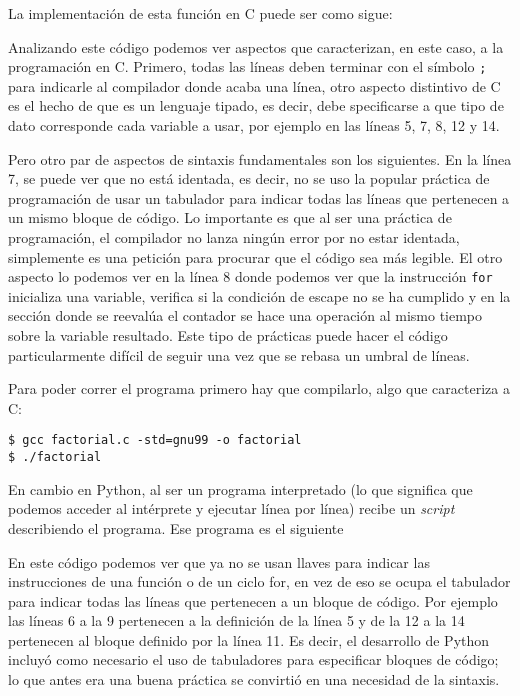 \documentclass{report}
\begin{document}
La implementación de esta función en C puede ser como sigue:



Analizando este código podemos ver aspectos que caracterizan, en este caso, a
la programación en C. Primero, todas las líneas deben terminar con el símbolo
{\tt{;}} para indicarle al compilador donde acaba una línea, otro aspecto 
distintivo de C es el hecho de que es un lenguaje tipado, es decir, debe 
specificarse a que tipo de dato corresponde cada variable a usar, por ejemplo 
en las líneas 5, 7, 8, 12 y 14. 

Pero otro par de aspectos de sintaxis fundamentales son los siguientes. 
En la línea 7, se puede ver que no está identada, es decir, no se uso la 
popular práctica de programación de usar un tabulador para indicar todas las 
líneas que pertenecen a un mismo bloque de código. Lo importante es que al ser
una práctica de programación, el compilador no lanza ningún error por no estar
identada, simplemente es una petición para procurar que el código sea más 
legible. El otro aspecto lo podemos ver en la línea 8 donde podemos ver que
la instrucción {\tt{for}} inicializa una variable, verifica si la condición
de escape no se ha cumplido y en la sección donde se reevalúa el contador 
se hace una operación al mismo tiempo sobre la variable resultado. Este tipo
de prácticas puede hacer el código particularmente difícil de seguir una
vez que se rebasa un umbral de líneas.

Para poder correr el programa primero hay que compilarlo, algo que caracteriza
a C:

\begin{verbatim}
$ gcc factorial.c -std=gnu99 -o factorial
$ ./factorial
\end{verbatim}

En cambio en Python, al ser un programa interpretado (lo que significa que 
podemos acceder al intérprete y ejecutar línea por línea) recibe un 
{\it{script}} describiendo el programa. Ese programa es el siguiente



En este código podemos ver que ya no se usan llaves para indicar las 
instrucciones de una función o de un ciclo for, en vez de eso se ocupa 
el tabulador para indicar todas las líneas que pertenecen a un bloque de 
código. Por ejemplo las líneas 6 a la 9 pertenecen a la definición de la línea
5 y de la 12 a la 14 pertenecen al bloque definido por la línea 11. Es decir,
el desarrollo de Python incluyó como necesario el uso de tabuladores para
especificar bloques de código; lo que antes era una buena práctica se convirtió
en una necesidad de la sintaxis.
\end{document}
